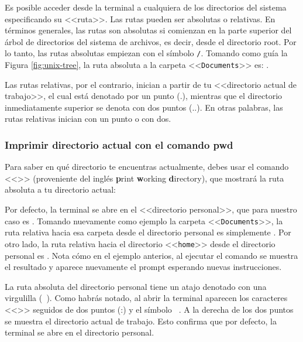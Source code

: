 Es posible acceder desde la terminal a cualquiera de los directorios del sistema especificando su <<ruta>>. Las rutas pueden ser absolutas o relativas. En términos generales, las rutas son absolutas si comienzan en la parte superior del árbol de directorios del sistema de archivos, es decir, desde el directorio root. Por lo tanto, las rutas absolutas empiezan con el símbolo \texttt{/}. Tomando como guía la Figura \ref{fig:unix-tree}, la ruta absoluta a la carpeta <<\texttt{Documents}>> es: .

Las rutas relativas, por el contrario, inician a partir de tu <<directorio actual de trabajo>>, el cual está denotado por un punto (.), mientras que el directorio inmediatamente superior se denota con dos puntos (..). En otras palabras, las rutas relativas inician con un punto o con dos. 

\subsubsection{Imprimir directorio actual con el comando pwd}
Para saber en qué directorio te encuentras actualmente, debes usar el comando <<>> (proveniente del inglés \textbf{p}rint \textbf{w}orking \textbf{d}irectory), que mostrará la ruta absoluta a tu directorio actual:


Por defecto, la terminal se abre en el <<directorio personal>>, que para nuestro caso es . Tomando nuevamente como ejemplo la carpeta <<\texttt{Documents}>>, la ruta relativa hacia esa carpeta desde el directorio personal es simplemente . Por otro lado, la ruta relativa hacia el directorio <<\texttt{home}>> desde el directorio personal es . Nota cómo en el ejemplo anterios, al ejecutar el comando  se muestra el resultado y aparece nuevamente el prompt esperando nuevas instrucciones.

La ruta absoluta del directorio personal tiene un atajo denotado con una virgulilla (\texttt{~}). Como habrás notado, al abrir la terminal aparecen los caracteres <<>> seguidos de dos puntos (:) y el símbolo \texttt{~}. A la derecha de los dos puntos se muestra el directorio actual de trabajo. Esto confirma que por defecto, la terminal se abre en el directorio personal.  

